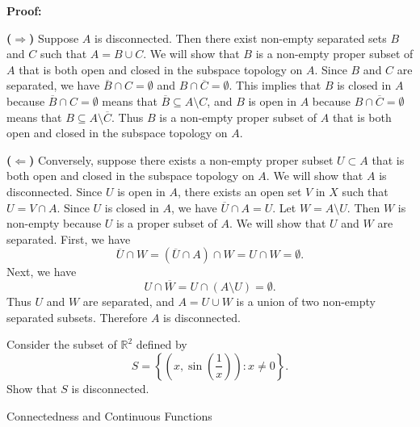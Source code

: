 \documentclass[12pt, a4paper]{article}
\begin{document}
\vspace{10pt}

\textbf{Proof:}

\textbf{($\Rightarrow$)}  Suppose \(A\) is disconnected.  Then there exist non-empty separated sets \(B\) and \(C\) such that \(A = B \cup C\).  We will show that \(B\) is a non-empty proper subset of \(A\) that is both open and closed in the subspace topology on \(A\).  Since \(B\) and \(C\) are separated, we have \(\overline{B} \cap C = \emptyset\) and \(B \cap \overline{C} = \emptyset\).  This implies that \(B\) is closed in \(A\) because \(\overline{B} \cap C = \emptyset\) means that \(\overline{B} \subseteq A \setminus C\), and \(B\) is open in \(A\) because \(B \cap \overline{C} = \emptyset\) means that \(B \subseteq A \setminus \overline{C}\).  Thus \(B\) is a non-empty proper subset of \(A\) that is both open and closed in the subspace topology on \(A\).

\textbf{($\Leftarrow$)}  Conversely, suppose there exists a non-empty proper subset \(U \subset A\) that is both open and closed in the subspace topology on \(A\).  We will show that \(A\) is disconnected.  Since \(U\) is open in \(A\), there exists an open set \(V\) in \(X\) such that \(U = V \cap A\).  Since \(U\) is closed in \(A\), we have \(\overline{U} \cap A = U\).  Let \(W = A \setminus U\).  Then \(W\) is non-empty because \(U\) is a proper subset of \(A\).  We will show that \(U\) and \(W\) are separated.  First, we have
\[
\overline{U} \cap W = (\overline{U} \cap A) \cap W = U \cap W = \emptyset.
\]
Next, we have
\[
U \cap \overline{W} = U \cap (A \setminus U) = \emptyset.
\]
Thus \(U\) and \(W\) are separated, and \(A = U \cup W\) is a union of two non-empty separated subsets.  Therefore \(A\) is disconnected.

\clearpage

\begin{problem}
    Consider the subset of \(\mathbb{R}^2\) defined by
    \[
        S = \left\{ \left(x, \sin\left(\frac{1}{x}\right)\right) : x \neq 0 \right\}.
    \]
    Show that \(S\) is disconnected.
\end{problem}

\clearpage

\begin{heading}
    Connectedness and Continuous Functions
\end{heading}

\vspace{10pt}
\end{document}
